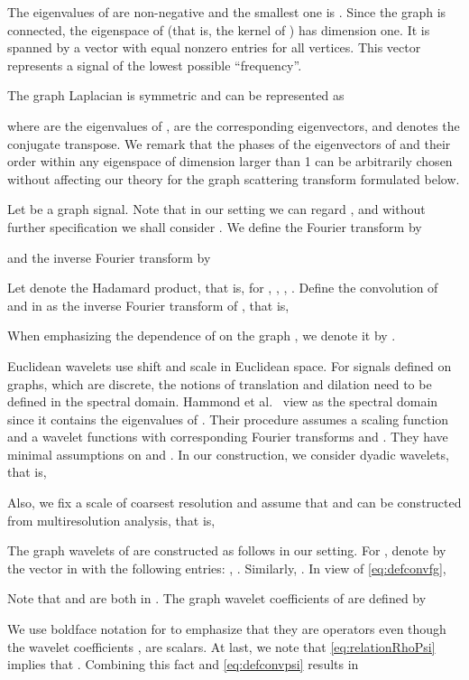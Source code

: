 \documentclass{article}
\begin{document}
The eigenvalues of  are non-negative and the smallest one is . Since the graph is connected, the eigenspace of  (that is, the kernel of ) has dimension one. It is spanned by a vector with equal nonzero entries for all vertices. This vector represents a signal of the lowest possible ``frequency''. 

The graph Laplacian  is symmetric and can be represented as

where  are the eigenvalues of ,  are the corresponding eigenvectors, and  denotes the conjugate transpose. We remark that the phases of the eigenvectors of  and their order within any eigenspace of dimension larger than 1 can be arbitrarily chosen without affecting our theory for the graph scattering transform formulated below.

Let  be a graph signal. Note that in our setting we can regard , and without further specification we shall consider . We define the Fourier transform  by

and the inverse Fourier transform  by

Let   denote the Hadamard product, that is, for , , , . Define the convolution of  and  in  as the inverse Fourier transform of , that is,

When emphasizing the dependence of  on the graph , we denote it by . 

Euclidean wavelets use shift and scale in Euclidean space. For signals defined on graphs, which are discrete, the notions of translation and dilation need to be defined in the spectral domain. Hammond et al.~\cite{HamVG11} view  as the spectral domain since it contains the eigenvalues of . Their procedure assumes a scaling function  and a wavelet functions  \cite{Dau92,Mal99} with corresponding Fourier transforms  and . They have minimal assumptions on  and . In our construction, we consider dyadic wavelets, that is, 
 
Also, we fix a scale  of coarsest resolution and assume that  and  can be constructed from multiresolution analysis, that is,

The graph wavelets of \cite{HamVG11} are constructed as follows in our setting. For , denote by  the vector in  with the following entries: , .  Similarly, . In view of \eqref{eq:defconvfg},

Note that  and  are both in . 
The graph wavelet coefficients of  are defined by 
 
We use boldface notation for  to emphasize that they are operators even though the wavelet coefficients , are scalars. At last, we note that \eqref{eq:relationRhoPsi} implies that . Combining this fact and \eqref{eq:defconvpsi} results in 
\end{document}

